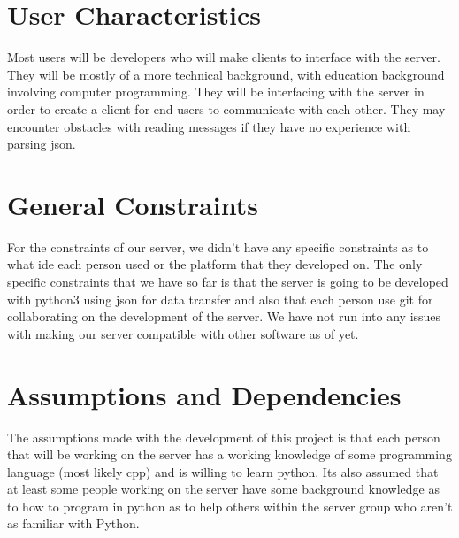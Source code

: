 \section{User Characteristics}\label{user-characteristics}
Most users will be developers who will make clients to interface with
the server. They will be mostly of a more technical background, with
education background involving computer programming. They will be
interfacing with the server in order to create a client for end users to
communicate with each other. They may encounter obstacles with reading
messages if they have no experience with parsing \gls{json}.

\section{General Constraints}\label{general-constraints}
For the constraints of our server, we didn't have any specific
constraints as to what \acrfull{ide} each person used or the platform that they
developed on. The only specific constraints that we have so far is that
the server is going to be developed with \gls{python}3 using \gls{json} for data
transfer and also that each person use \gls{git} for collaborating on the
development of the server. We have not run into any issues with making
our server compatible with other software as of yet.

\section{Assumptions and
Dependencies}\label{assumptions-and-dependencies}
The assumptions made with the development of this project is that each
person that will be working on the server has a working knowledge of
some programming language (most likely \gls{cpp}) and is willing to learn
python. Its also assumed that at least some people working on the server
have some background knowledge as to how to program in python as to help
others within the server group who aren't as familiar with Python.
